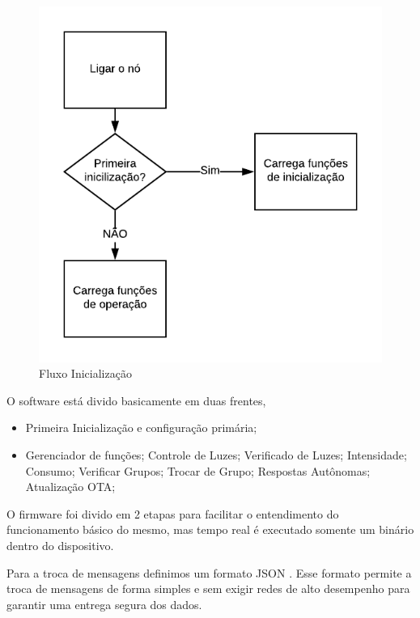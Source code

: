 \documentclass[openright]{normas-utf-tex} %
\begin{document}
\begin{figure}[!htb]
     \centering
     \includegraphics[scale=1]{Primeira_Inicializacao.png}
     \caption{Fluxo Inicialização}
     \label{}
\end{figure}

O software está divido basicamente em duas frentes,

\begin{itemize}
    \item Primeira Inicialização e configuração primária;
    \item Gerenciador de funções;
    \subitem Controle de Luzes;
    \subitem Verificado de Luzes;
    \subitem Intensidade;
    \subitem Consumo;
    \subitem Verificar Grupos;
    \subitem Trocar de Grupo;
    \subitem Respostas Autônomas;
    \subitem Atualização OTA;
\end{itemize}

O firmware foi divido em 2 etapas para facilitar o entendimento do funcionamento básico do mesmo, mas tempo real é executado somente um binário dentro do dispositivo.

Para a troca de mensagens definimos um formato JSON \cite{json-devmedia}. Esse formato permite a troca de mensagens de forma simples e sem exigir redes de alto desempenho para garantir uma entrega segura dos dados.
\end{document}
